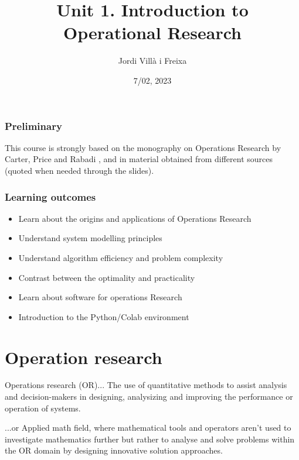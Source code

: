\documentclass[c]{beamer}
\title[Introduction]{Unit 1. Introduction to Operational Research}
\author{Jordi Villà i Freixa}
\institute[FCTE]{
Universitat de Vic - Universitat Central de Catalunya \\
Study Abroad. Operations Research\\
\medskip
\textit{jordi.villa@uvic.cat}
}
\date{7/02, 2023}
\begin{document}
\begin{frame}
\titlepage
\end{frame}

\begin{frame}
\frametitle{Preliminary}
This course is strongly based on the monography on Operations Research by Carter, Price and Rabadi \cite{carter}, and in material obtained from different sources (quoted when needed through the slides).
\end{frame}


\begin{frame}
\frametitle{Learning outcomes}
\begin{itemize}
  \item Learn about the origins and applications of Operations Research
  \item Understand system modelling principles
  \item Understand algorithm efficiency and problem complexity
  \item Contrast between the optimality and practicality
  \item Learn about software for operations Research
  \item Introduction to the Python/Colab environment
\end{itemize}
\end{frame}


\section{Operation research}

\begin{frame}
\begin{block}{Operations research (OR)...}
The use of quantitative methods to assist analysis and decision-makers in designing, analysizing and improving the performance or operation of systems.
\end{block}
\begin{block}{...or}
Applied math field, where mathematical tools and operators aren’t used to investigate mathematics further but rather to analyse and solve problems within the OR domain by designing innovative solution approaches.
\end{block}
\end{frame}
\end{document}
